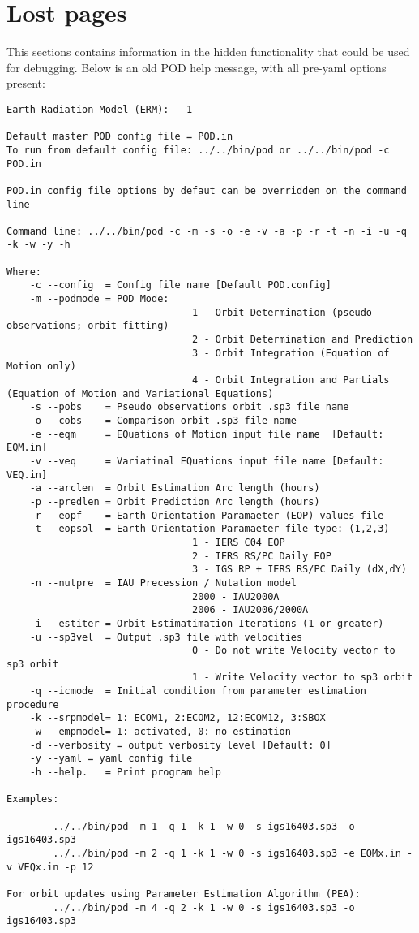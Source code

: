 \chapter{Lost pages}
\label{ch:lost pages}
This sections contains information in the hidden functionality that could be used for debugging.
Below is an old POD help message, with all pre-yaml options present:
\begin{lstlisting}
Earth Radiation Model (ERM):   1

Default master POD config file = POD.in
To run from default config file: ../../bin/pod or ../../bin/pod -c POD.in

POD.in config file options by defaut can be overridden on the command line

Command line: ../../bin/pod -c -m -s -o -e -v -a -p -r -t -n -i -u -q -k -w -y -h 

Where: 
    -c --config  = Config file name [Default POD.config]
    -m --podmode = POD Mode:
                                1 - Orbit Determination (pseudo-observations; orbit fitting)
                                2 - Orbit Determination and Prediction
                                3 - Orbit Integration (Equation of Motion only)
                                4 - Orbit Integration and Partials (Equation of Motion and Variational Equations)
    -s --pobs    = Pseudo observations orbit .sp3 file name
    -o --cobs    = Comparison orbit .sp3 file name
    -e --eqm     = EQuations of Motion input file name  [Default: EQM.in]
    -v --veq     = Variatinal EQuations input file name [Default: VEQ.in]
    -a --arclen  = Orbit Estimation Arc length (hours)
    -p --predlen = Orbit Prediction Arc length (hours)
    -r --eopf    = Earth Orientation Paramaeter (EOP) values file
    -t --eopsol  = Earth Orientation Paramaeter file type: (1,2,3)
                                1 - IERS C04 EOP
                                2 - IERS RS/PC Daily EOP
                                3 - IGS RP + IERS RS/PC Daily (dX,dY)
    -n --nutpre  = IAU Precession / Nutation model
                                2000 - IAU2000A
                                2006 - IAU2006/2000A
    -i --estiter = Orbit Estimatimation Iterations (1 or greater)
    -u --sp3vel  = Output .sp3 file with velocities
                                0 - Do not write Velocity vector to sp3 orbit
                                1 - Write Velocity vector to sp3 orbit
    -q --icmode  = Initial condition from parameter estimation procedure
    -k --srpmodel= 1: ECOM1, 2:ECOM2, 12:ECOM12, 3:SBOX
    -w --empmodel= 1: activated, 0: no estimation
    -d --verbosity = output verbosity level [Default: 0]
    -y --yaml = yaml config file
    -h --help.   = Print program help

Examples:

        ../../bin/pod -m 1 -q 1 -k 1 -w 0 -s igs16403.sp3 -o igs16403.sp3 
        ../../bin/pod -m 2 -q 1 -k 1 -w 0 -s igs16403.sp3 -e EQMx.in -v VEQx.in -p 12

For orbit updates using Parameter Estimation Algorithm (PEA):
        ../../bin/pod -m 4 -q 2 -k 1 -w 0 -s igs16403.sp3 -o igs16403.sp3
\end{lstlisting}
